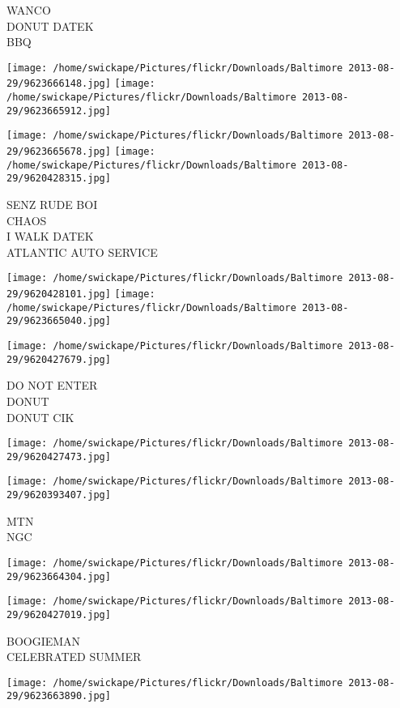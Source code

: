 \documentclass[10pt,letterpaper]{article}
\begin{document}
WANCO\\
DONUT DATEK\\
BBQ
\pagebreak

\texttt{[image: /home/swickape/Pictures/flickr/Downloads/Baltimore 2013-08-29/9623666148.jpg]}
\texttt{[image: /home/swickape/Pictures/flickr/Downloads/Baltimore 2013-08-29/9623665912.jpg]}

\texttt{[image: /home/swickape/Pictures/flickr/Downloads/Baltimore 2013-08-29/9623665678.jpg]}
\texttt{[image: /home/swickape/Pictures/flickr/Downloads/Baltimore 2013-08-29/9620428315.jpg]}

SENZ RUDE BOI\\
CHAOS\\
I WALK  DATEK\\
ATLANTIC AUTO SERVICE
\pagebreak

\texttt{[image: /home/swickape/Pictures/flickr/Downloads/Baltimore 2013-08-29/9620428101.jpg]}
\texttt{[image: /home/swickape/Pictures/flickr/Downloads/Baltimore 2013-08-29/9623665040.jpg]}

\texttt{[image: /home/swickape/Pictures/flickr/Downloads/Baltimore 2013-08-29/9620427679.jpg]}

DO NOT ENTER\\
DONUT\\
DONUT CIK
\pagebreak

\texttt{[image: /home/swickape/Pictures/flickr/Downloads/Baltimore 2013-08-29/9620427473.jpg]}

\vspace{0.25in}
\texttt{[image: /home/swickape/Pictures/flickr/Downloads/Baltimore 2013-08-29/9620393407.jpg]}

MTN\\
NGC
\pagebreak

\texttt{[image: /home/swickape/Pictures/flickr/Downloads/Baltimore 2013-08-29/9623664304.jpg]}

\vspace{0.25in}
\texttt{[image: /home/swickape/Pictures/flickr/Downloads/Baltimore 2013-08-29/9620427019.jpg]}

BOOGIEMAN\\
CELEBRATED SUMMER
\pagebreak

\texttt{[image: /home/swickape/Pictures/flickr/Downloads/Baltimore 2013-08-29/9623663890.jpg]}
\end{document}
